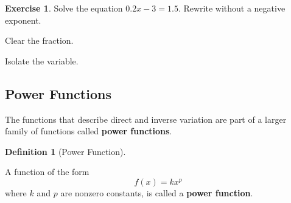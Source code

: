 \documentclass[10pt,]{book}
\newcommand{\terminology}[1]{\textbf{#1}}
\theoremstyle{plain}
\theoremstyle{definition}
\newtheorem{definition}[theorem]{Definition}
\theoremstyle{definition}
\theoremstyle{definition}
\theoremstyle{definition}
\theoremstyle{definition}
\newtheorem{exercise}[theorem]{Exercise}
\numberwithin{equation}{section}
\begin{document}
\begin{exercise}\label{solve-power-equation}
Solve the equation \(0.2x−3 = 1.5\).%
Rewrite without a negative exponent.%
\par
Clear the fraction.%
\par
Isolate the variable.%
\end{exercise}
\typeout{************************************************}
\typeout{************************************************}
\subsection[Power Functions]{Power Functions}\label{subsection-64}

    The functions that describe direct and inverse variation are part of a larger family of functions called \terminology{power functions}.
%
\begin{definition}[Power Function]\label{definition-3}

        A function of the form
        \begin{equation*}f(x) = kx^p\end{equation*}
        where \(k\) and \(p\) are nonzero constants, is called a \terminology{power function}.
    \end{definition}
\par
\end{document}
